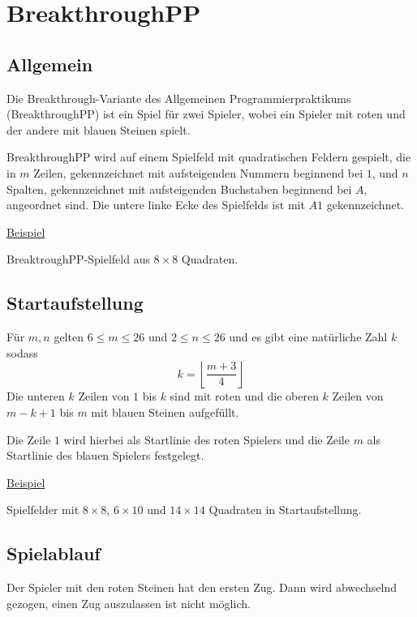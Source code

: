 \section*{BreakthroughPP}
\newcommand{\myAlph}[1]{\char\numexpr`A-1+#1\relax}
\newcommand{\myalph}[1]{\char\numexpr`a-1+#1\relax}

\subsection*{Allgemein}
Die Breakthrough-Variante des Allgemeinen Programmierpraktikums (BreakthroughPP) ist ein Spiel für zwei Spieler, wobei ein Spieler mit roten und der andere mit blauen Steinen spielt.

BreakthroughPP wird auf einem Spielfeld mit quadratischen Feldern gespielt, die in $m$ Zeilen, gekennzeichnet mit aufsteigenden Nummern beginnend bei $1$, und $n$ Spalten, gekennzeichnet mit aufsteigenden Buchstaben beginnend bei $A$, angeordnet sind. Die untere linke Ecke des Spielfelds ist mit $A1$ gekennzeichnet.

\underline{Beispiel}

BreaktroughPP-Spielfeld aus $8 \times 8$ Quadraten.
\begin{center}

\end{center}

\subsection*{Startaufstellung}
Für $m, n$ gelten $6 \le m \le 26$ und $2 \le n \le 26$ und es gibt eine natürliche Zahl $k$ sodass \[k = \left\lfloor \frac{m + 3}{4} \right\rfloor \] 
Die unteren $k$ Zeilen von $1$ bis $k$ sind mit roten und die oberen $k$ Zeilen von $m-k+1$ bis $m$  mit blauen Steinen aufgefüllt.

Die Zeile $1$ wird hierbei als Startlinie des roten Spielers und die Zeile $m$ als Startlinie des blauen Spielers festgelegt.

\newpage
\underline{Beispiel}

Spielfelder mit $8 \times 8$, $6 \times 10$ und $14 \times 14$ Quadraten in Startaufstellung.
\begin{center}
 \hfill 
\end{center}
\begin{center}

\end{center}

\subsection*{Spielablauf}
Der Spieler mit den roten Steinen hat den ersten Zug. Dann wird abwechselnd gezogen, einen Zug auszulassen ist nicht möglich.
\medskip

